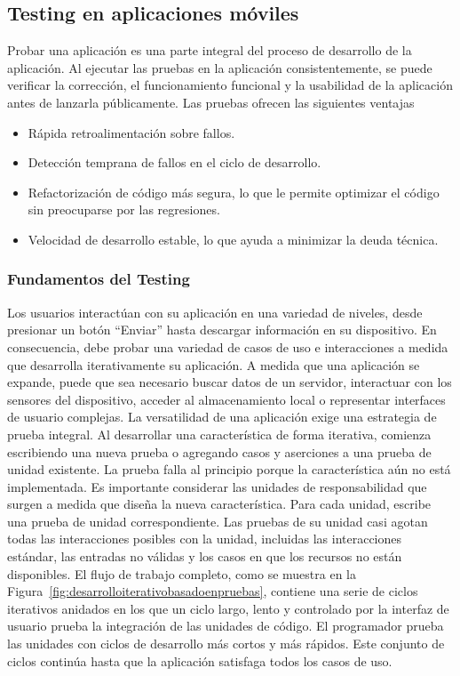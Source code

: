 \subsection{Testing en aplicaciones móviles}
Probar una aplicación es una parte integral del proceso de desarrollo de la aplicación. Al ejecutar las pruebas en la aplicación consistentemente, se puede verificar la corrección, el funcionamiento funcional y la usabilidad de la aplicación antes de lanzarla públicamente. Las pruebas ofrecen las siguientes ventajas~\cite{androiddeveloper}
\begin{itemize}
	\item Rápida retroalimentación sobre fallos.
	\item Detección temprana de fallos en el ciclo de desarrollo.
	\item Refactorización de código más segura, lo que le permite optimizar el código sin preocuparse por las regresiones.
	\item Velocidad de desarrollo estable, lo que ayuda a minimizar la deuda técnica.
\end{itemize}
\subsubsection{Fundamentos del Testing}
Los usuarios interactúan con su aplicación en una variedad de niveles, desde presionar un botón ``Enviar'' hasta descargar información en su dispositivo. En consecuencia, debe probar una variedad de casos de uso e interacciones a medida que desarrolla iterativamente su aplicación.
A medida que una aplicación se expande, puede que sea necesario buscar datos de un servidor, interactuar con los sensores del dispositivo, acceder al almacenamiento local o representar interfaces de usuario complejas. La versatilidad de una aplicación exige una estrategia de prueba integral. Al desarrollar una característica de forma iterativa, comienza escribiendo una nueva prueba o agregando casos y aserciones a una prueba de unidad existente. La prueba falla al principio porque la característica aún no está implementada. Es importante considerar las unidades de responsabilidad que surgen a medida que diseña la nueva característica. Para cada unidad, escribe una prueba de unidad correspondiente. Las pruebas de su unidad casi agotan todas las interacciones posibles con la unidad, incluidas las interacciones estándar, las entradas no válidas y los casos en que los recursos no están disponibles.
El flujo de trabajo completo, como se muestra en la Figura~\ref{fig:desarrolloiterativobasadoenpruebas}, contiene una serie de ciclos iterativos anidados en los que un ciclo largo, lento y controlado por la interfaz de usuario prueba la integración de las unidades de código. El programador prueba las unidades con ciclos de desarrollo más cortos y más rápidos. Este conjunto de ciclos continúa hasta que la aplicación satisfaga todos los casos de uso.

